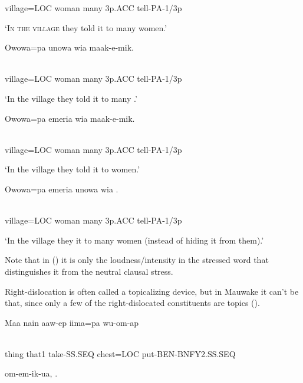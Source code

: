 village=LOC  woman  many  3p.ACC  tell-PA-1/3p

`\textsc{In the village} they told it to many women.'

\ea%
\label{ex:x1740}
\gll Owowa=pa  \textstyleEmphasizedVernacularWords{{{\textprimstress}}}  unowa  wia  maak-e-mik. \\
      \\
\glt
\z

village=LOC  woman  many  3p.ACC  tell-PA-1/3p

`In the village they told it to many .'

\ea%
\label{ex:x1741}
\gll Owowa=pa  emeria  \textstyleEmphasizedVernacularWords{{{\textprimstress}}}  wia  maak-e-mik. \\
      \\
\glt
\z

village=LOC  woman  many  3p.ACC  tell-PA-1/3p

`In the village they told it to  women.'

\ea%
\label{ex:x1742}
\gll Owowa=pa  emeria  unowa  wia  \textstyleEmphasizedVernacularWords{{{\textprimstress}}}. \\
      \\
\glt
\z

village=LOC  woman  many  3p.ACC  tell-PA-1/3p

`In the village they  it to many women (instead of hiding it from them).'

Note that in () it is only the loudness/intensity in the stressed word that distinguishes it from the neutral clausal stress.

Right-dislocation is often called a topicalizing device, but in Mauwake it can't be that, since only a few of the right-dislocated constituents are topics (). 

\ea%
\label{ex:x1745}
\gll Maa  nain  aaw-ep  iima=pa  wu-om-ap  \\
      \\
\glt
\z

thing  that1  take-SS.SEQ  chest=LOC  put-BEN-BNFY2.SS.SEQ

om-em-ik-ua,   \textstyleEmphasizedVernacularWords{}  \textstyleEmphasizedVernacularWords{} .

